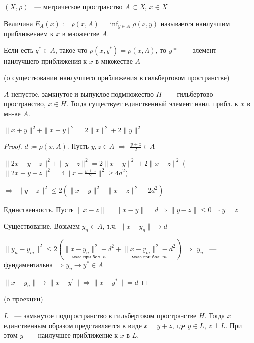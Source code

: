   \begin{definition}
   $(X, \rho)$ ~--- метрическое пространство $A\subset X$, $x\in X$
   
   Величина $E_A(x) := \rho(x, A) = \inf_{y \in A} \rho(x, y)$ называется наилучшим приближением
   к $x$ в множестве $A$.
  \end{definition}
  
  \begin{definition}
   Если есть $y^*\in A$, такое что $\rho(x, y^*) = \rho(x, A)$, то $y*$ ~--- элемент наилучшего
   приближения к $x$ в множестве $A$
  \end{definition}
  
  \begin{theorem}(о существовании наилучшего приближения в гильбертовом пространстве)
  
  $A$ непустое, замкнутое и выпуклое подмножество $H$ ~--- гильбертово пространство, $x\in H$.
  Тогда существует единственный элемент наил. прибл. к $x$ в мн-ве $A$.
  \end{theorem}
  
  \begin{lemma}
  $\|x + y\|^2 + \|x-y\|^2  = 2 \|x\|^2 + 2\|y\|^2$
  \end{lemma}
  
  \begin{proof}
  $d := \rho(x, A)$. Пусть $y, z \in A$ $\Rightarrow$ $\frac{y + z}{2}\in A$
  
  $\|2x -y - z\|^2 + \|y - z\|^2 = 2\|x-y\|^2 + 2\|x-z\|^2$ ($\|2x - y - z\|^2 = 4\|x - \frac{y + z}{2}\|^2 \ge 4d^2$)
  
  $\Rightarrow $ $\|y - z\|^2\le 2(\|x - y\|^2 + \| x- z\|^2 - 2d^2)$
  
  Единственность. Пусть $\|x - z\| = \|x - y\| = d \Rightarrow \|y - z\|\le 0 \Rightarrow y = z$
  
  Существование. Возьмем $y_n \in A$, т.ч. $\|x - y_n\|\rightarrow d$
  
  $\|y_n - y_m\|^2 \le 2(\underset{\text{мала при бол. $n$}}{\|x - y_n\|^2  - d^2}+
   \underset{\text{мала при бол. $m$}}{\| x- y_m\|^2 - d^2})$ $\Rightarrow$ $y_n$ ~--- 
   фундаментальна $\Rightarrow y_n\rightarrow y^* \in A$
   
   $\|x - y_n\|\rightarrow \|x - y^*\| \Rightarrow \|x - y^*\| = d$
   \end{proof}
   
   \begin{theorem}(о проекции)
   
   $L$ ~--- замкнутое подпространство в гильбертовом пространстве $H$. Тогда $x$
   единственным образом представляется в виде $x = y+z$, где $y \in L$, $z \perp L$.
   При этом $y$ ~--- наилучшее приближение к $x$ в $L$.
   \end{theorem}
   
